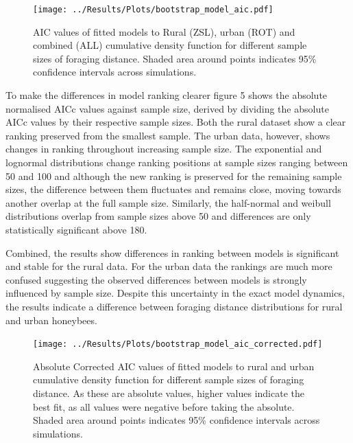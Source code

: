 \documentclass[11pt]{article}
\begin{document}
\begin{linenumbers}
\begin{figure}[H]
	\texttt{[image: ../Results/Plots/bootstrap\_model\_aic.pdf]}
	\caption{AIC values of fitted models to Rural (ZSL), urban (ROT) and combined (ALL) cumulative density function for different sample sizes of foraging distance. Shaded area around points indicates 95\% confidence intervals across simulations.}
\end{figure}

To make the differences in model ranking clearer figure 5 shows the absolute normalised AICc values against sample size, derived by dividing the absolute AICc values by their respective sample sizes. Both the rural dataset show a clear ranking preserved from the smallest sample. The urban data, however, shows changes in ranking throughout increasing sample size. The exponential and lognormal distributions change ranking positions at sample sizes ranging between 50 and 100 and although the new ranking is preserved for the remaining sample sizes, the difference between them fluctuates and remains close, moving towards another overlap at the full sample size. Similarly, the half-normal and weibull distributions overlap from sample sizes above 50 and differences are only statistically significant above 180.\par 

Combined, the results show differences in ranking between models is significant and stable for the rural data. For the urban data the rankings are much more confused suggesting the observed differences between models is strongly influenced by sample size. Despite this uncertainty in the exact model dynamics, the results indicate a difference between foraging distance distributions for rural and urban honeybees.  

\begin{figure}[H]
	\texttt{[image: ../Results/Plots/bootstrap\_model\_aic\_corrected.pdf]}
	\caption{Absolute Corrected AIC values of fitted models to rural and urban cumulative density function for different sample sizes of foraging distance. As these are absolute values, higher values indicate the best fit, as all values were negative before taking the absolute. Shaded area around points indicates 95\% confidence intervals across simulations.}
\end{figure}

\end{linenumbers}
\end{document}
